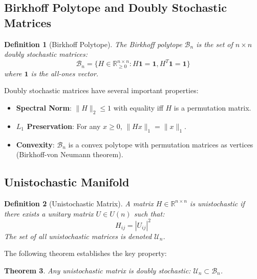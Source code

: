 \documentclass[11pt,a4paper]{article}
\newtheorem{theorem}{Theorem}[section]
\newtheorem{definition}[theorem]{Definition}
\newcommand{\R}{\mathbb{R}}
\newcommand{\U}{\mathcal{U}}
\newcommand{\B}{\mathcal{B}}
\begin{document}
\subsection{Birkhoff Polytope and Doubly Stochastic Matrices}

\begin{definition}[Birkhoff Polytope]
The Birkhoff polytope $\B_n$ is the set of $n \times n$ doubly stochastic matrices:
\begin{equation}
\B_n = \{H \in \R^{n \times n}_{\geq 0} : H\mathbf{1} = \mathbf{1}, H^T\mathbf{1} = \mathbf{1}\}
\end{equation}
where $\mathbf{1}$ is the all-ones vector.
\end{definition}

Doubly stochastic matrices have several important properties:
\begin{itemize}
    \item \textbf{Spectral Norm}: $\|H\|_2 \leq 1$ with equality iff $H$ is a permutation matrix.
    \item \textbf{$L_1$ Preservation}: For any $x \geq 0$, $\|Hx\|_1 = \|x\|_1$.
    \item \textbf{Convexity}: $\B_n$ is a convex polytope with permutation matrices as vertices (Birkhoff-von Neumann theorem).
\end{itemize}

\subsection{Unistochastic Manifold}

\begin{definition}[Unistochastic Matrix]
A matrix $H \in \R^{n \times n}$ is unistochastic if there exists a unitary matrix $U \in U(n)$ such that:
\begin{equation}
H_{ij} = |U_{ij}|^2
\end{equation}
The set of all unistochastic matrices is denoted $\U_n$.
\end{definition}

The following theorem establishes the key property:

\begin{theorem}
\label{thm:unistochastic}
Any unistochastic matrix is doubly stochastic: $\U_n \subset \B_n$.
\end{theorem}
\end{document}

